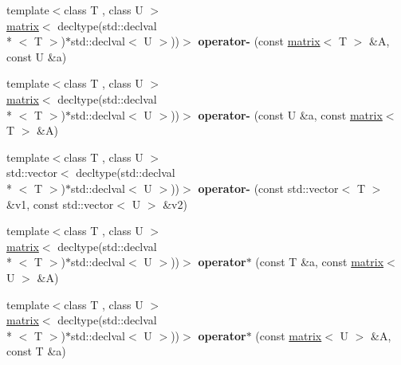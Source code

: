 \begin{DoxyCompactItemize}
\item 
\hypertarget{namespacekeycpp_a71a8f2ebc458f06e29b17ecc28ed000d}{{\footnotesize template$<$class T , class U $>$ }\\\hyperlink{classkeycpp_1_1matrix}{matrix}$<$ decltype(std\-::declval\\*
$<$ T $>$)$\ast$std\-::declval$<$ U $>$))$>$ {\bfseries operator-\/} (const \hyperlink{classkeycpp_1_1matrix}{matrix}$<$ T $>$ \&A, const U \&a)}\label{namespacekeycpp_a71a8f2ebc458f06e29b17ecc28ed000d}

\item 
\hypertarget{namespacekeycpp_a4bc853f9410d964ef9f163ce53ea4828}{{\footnotesize template$<$class T , class U $>$ }\\\hyperlink{classkeycpp_1_1matrix}{matrix}$<$ decltype(std\-::declval\\*
$<$ T $>$)$\ast$std\-::declval$<$ U $>$))$>$ {\bfseries operator-\/} (const U \&a, const \hyperlink{classkeycpp_1_1matrix}{matrix}$<$ T $>$ \&A)}\label{namespacekeycpp_a4bc853f9410d964ef9f163ce53ea4828}

\item 
\hypertarget{namespacekeycpp_ab185edce957f4afd65cb641ec6307376}{{\footnotesize template$<$class T , class U $>$ }\\std\-::vector$<$ decltype(std\-::declval\\*
$<$ T $>$)$\ast$std\-::declval$<$ U $>$))$>$ {\bfseries operator-\/} (const std\-::vector$<$ T $>$ \&v1, const std\-::vector$<$ U $>$ \&v2)}\label{namespacekeycpp_ab185edce957f4afd65cb641ec6307376}

\item 
\hypertarget{namespacekeycpp_a8d5dbf37b71d16d686dd0fdbad82f8fb}{{\footnotesize template$<$class T , class U $>$ }\\\hyperlink{classkeycpp_1_1matrix}{matrix}$<$ decltype(std\-::declval\\*
$<$ T $>$)$\ast$std\-::declval$<$ U $>$))$>$ {\bfseries operator$\ast$} (const T \&a, const \hyperlink{classkeycpp_1_1matrix}{matrix}$<$ U $>$ \&A)}\label{namespacekeycpp_a8d5dbf37b71d16d686dd0fdbad82f8fb}

\item 
\hypertarget{namespacekeycpp_ae187563f8f86e256bc1394edcba1b2b1}{{\footnotesize template$<$class T , class U $>$ }\\\hyperlink{classkeycpp_1_1matrix}{matrix}$<$ decltype(std\-::declval\\*
$<$ T $>$)$\ast$std\-::declval$<$ U $>$))$>$ {\bfseries operator$\ast$} (const \hyperlink{classkeycpp_1_1matrix}{matrix}$<$ U $>$ \&A, const T \&a)}\label{namespacekeycpp_ae187563f8f86e256bc1394edcba1b2b1}


\end{DoxyCompactItemize}
